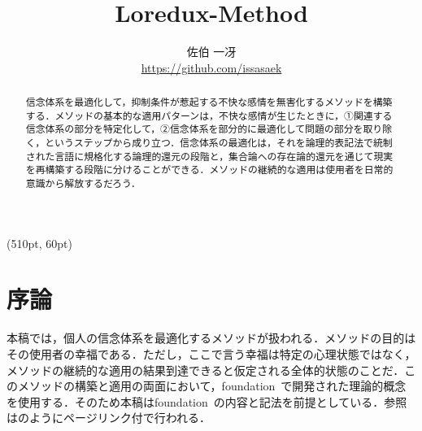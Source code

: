 
\begin{textblock*}{0.1\linewidth}(510pt, 60pt)
    \small \version
\end{textblock*}

\title{Loredux-Method}
\author{佐伯 一冴\\\small\url{https://github.com/issasaek}}
\date{}
\maketitle

\begin{abstract}
    信念体系を最適化して，抑制条件が惹起する不快な感情を無害化するメソッドを構築する．メソッドの基本的な適用パターンは，不快な感情が生じたときに，①関連する信念体系の部分を特定化して，②信念体系を部分的に最適化して問題の部分を取り除く，というステップから成り立つ．信念体系の最適化は，それを論理的表記法で統制された言語に規格化する論理的還元の段階と，集合論への存在論的還元を通じて現実を再構築する段階に分けることができる．メソッドの継続的な適用は使用者を日常的意識から解放するだろう．
\end{abstract}

\section{序論}
\label{sec:序論}

本稿では，個人の信念体系を最適化するメソッドが扱われる．メソッドの目的はその使用者の幸福である．ただし，ここで言う幸福は特定の心理状態ではなく，メソッドの継続的な適用の結果到達できると仮定される全体的状態のことだ．このメソッドの構築と適用の両面において，foundation~\cite{foundation}で開発された理論的概念を使用する．そのため本稿はfoundation~\cite{foundation}の内容と記法を前提としている．参照はのようにページリンク付で行われる．

